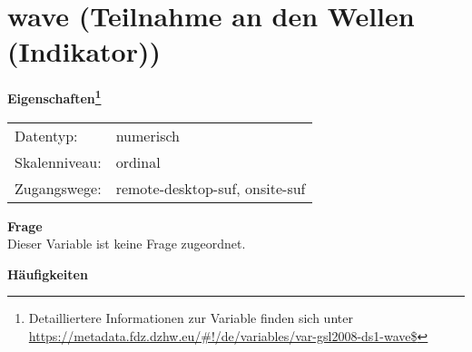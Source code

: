 
    \setcounter{footnote}{0}

    \vspace*{-1.8cm}
	\section{wave (Teilnahme an den Wellen (Indikator))}
	\label{section:wave}



    \vspace*{0.5cm}
    \noindent\textbf{Eigenschaften\footnote{Detailliertere Informationen zur Variable finden sich unter
		\url{https://metadata.fdz.dzhw.eu/\#!/de/variables/var-gsl2008-ds1-wave$}}}\\
	\begin{tabularx}{\hsize}{@{}lX}
	Datentyp: & numerisch \\
	Skalenniveau: & ordinal \\
	Zugangswege: &
	  remote-desktop-suf, 
	  onsite-suf
 \\
    \end{tabularx}



		\vspace*{0.5cm}
		\noindent\textbf{Frage}\\
		Dieser Variable ist keine Frage zugeordnet.





        		\vspace*{0.5cm}
                \noindent\textbf{Häufigkeiten}

